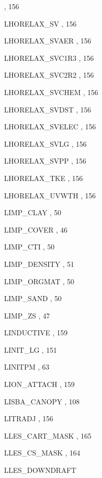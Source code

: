 \begin{theindex}
    \subitem {},  156
  \item LHORELAX\_SV
    \subitem {},  156
  \item LHORELAX\_SVAER
    \subitem {},  156
  \item LHORELAX\_SVC1R3
    \subitem {},  156
  \item LHORELAX\_SVC2R2
    \subitem {},  156
  \item LHORELAX\_SVCHEM
    \subitem {},  156
  \item LHORELAX\_SVDST
    \subitem {},  156
  \item LHORELAX\_SVELEC
    \subitem {},  156
  \item LHORELAX\_SVLG
    \subitem {},  156
  \item LHORELAX\_SVPP
    \subitem {},  156
  \item LHORELAX\_TKE
    \subitem {},  156
  \item LHORELAX\_UVWTH
    \subitem {},  156
  \item LIMP\_CLAY
    \subitem {},  50
  \item LIMP\_COVER
    \subitem {},  46
  \item LIMP\_CTI
    \subitem {},  50
  \item LIMP\_DENSITY
    \subitem {},  51
  \item LIMP\_ORGMAT
    \subitem {},  50
  \item LIMP\_SAND
    \subitem {},  50
  \item LIMP\_ZS
    \subitem {},  47
  \item LINDUCTIVE
    \subitem {},  159
  \item LINIT\_LG
    \subitem {},  151
  \item LINITPM
    \subitem {},  63
  \item LION\_ATTACH
    \subitem {},  159
  \item LISBA\_CANOPY
    \subitem {},  108
  \item LITRADJ
    \subitem {},  156
  \item LLES\_CART\_MASK
    \subitem {},  165
  \item LLES\_CS\_MASK
    \subitem {},  164
  \item LLES\_DOWNDRAFT

\end{theindex}
